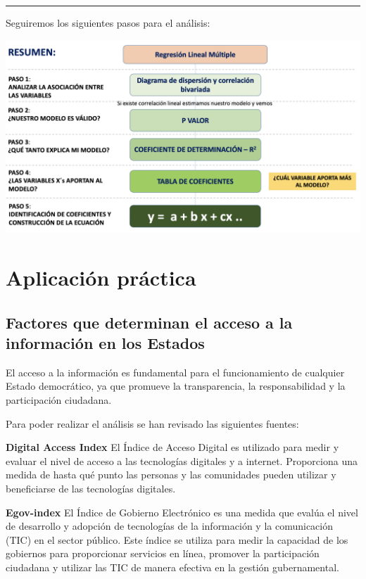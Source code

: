 \documentclass[
]{article}
\begin{document}
\begin{center}\rule{0.5\linewidth}{0.5pt}\end{center}

Seguiremos los siguientes pasos para el análisis:

\begin{center}\includegraphics[width=1\linewidth]{pd12_diap2} \end{center}

\section{Aplicación práctica}\label{aplicaciuxf3n-pruxe1ctica}

\subsection{\texorpdfstring{\textbf{Factores que determinan el acceso a
la información en los
Estados}}{Factores que determinan el acceso a la información en los Estados}}\label{factores-que-determinan-el-acceso-a-la-informaciuxf3n-en-los-estados}

El acceso a la información es fundamental para el funcionamiento de
cualquier Estado democrático, ya que promueve la transparencia, la
responsabilidad y la participación ciudadana.

Para poder realizar el análisis se han revisado las siguientes fuentes:

\textbf{Digital Access Index} El Índice de Acceso Digital es utilizado
para medir y evaluar el nivel de acceso a las tecnologías digitales y a
internet. Proporciona una medida de hasta qué punto las personas y las
comunidades pueden utilizar y beneficiarse de las tecnologías digitales.

\textbf{Egov-index} El Índice de Gobierno Electrónico es una medida que
evalúa el nivel de desarrollo y adopción de tecnologías de la
información y la comunicación (TIC) en el sector público. Este índice se
utiliza para medir la capacidad de los gobiernos para proporcionar
servicios en línea, promover la participación ciudadana y utilizar las
TIC de manera efectiva en la gestión gubernamental.
\end{document}
